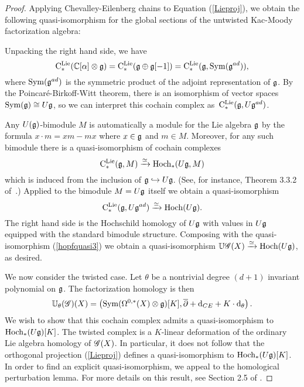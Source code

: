 \begin{proof}


Applying Chevalley-Eilenberg chains to Equation (\ref{Lieproj}), we obtain the following quasi-isomorphism for the global sections of the untwisted Kac-Moody factorization algebra:
\beqn\label{hopfquasi3}
\eeqn
Unpacking the right hand side, we have
\[
{\rm C}^{\rm Lie}_*(\mathbb C[\alpha] \otimes \mathfrak g) = {\rm C}^{\rm Lie}_*(\mathfrak g \oplus \mathfrak g[-1]) = {\rm C}^{\rm Lie}_*(\mathfrak g, {\rm Sym} (\mathfrak g^{ad})),
\] 
where ${\rm Sym}(\mathfrak g^{ad})$ is the symmetric product of the adjoint representation of $\mathfrak g$. 
By the Poincar\'{e}-Birkoff-Witt theorem, there is an isomorphism of vector spaces ${\rm Sym}(\mathfrak g) \cong U \mathfrak g$, so we can interpret this cochain complex as~${\rm C}^{\rm Lie}_*(\mathfrak g, U \mathfrak g^{ad})$.

Any $U(\mathfrak g)$-bimodule $M$ is automatically a module for the Lie algebra $\mathfrak g$ by the formula $x \cdot m = xm - mx$ where $x \in \mathfrak g$ and $m \in M$.
Moreover, for any such bimodule there is a quasi-isomorphism of cochain complexes 
\[
{\rm C}^{\rm Lie}_*(\mathfrak g, M) \xrightarrow{\simeq} {\rm Hoch}_*(U\mathfrak g, M) 
\]
which is induced from the inclusion of $\mathfrak g \hookrightarrow U \mathfrak g$. 
(See, for instance, Theorem 3.3.2 of~\cite{LodayCyclic}.)
Applied to the bimodule $M = U\mathfrak g$ itself we obtain a quasi-isomorphism 
\[
{\rm C}^{\rm Lie}_*(\mathfrak g , U\mathfrak g^{ad}) \xrightarrow{\simeq} {\rm Hoch}(U\mathfrak g).
\]
The right hand side is the Hochschild homology of $U\mathfrak g$ with values in $U\mathfrak g$ equipped with the standard bimodule structure. 
Composing with the quasi-isomorphism (\ref{hopfquasi3}) we obtain a quasi-isomorphism $\mathbb U\mathscr G(X) \xrightarrow{\simeq} {\rm Hoch}(U\mathfrak g)$, as desired.

We now consider the twisted case. 
Let $\theta$ be a nontrivial degree $(d+1)$ invariant polynomial on $\mathfrak g$. 
The factorization homology is then 
\[
\mathbb U_\theta (\mathscr G)(X) = \left({\rm Sym}(\Omega^{0,*}(X) \otimes \mathfrak g)[K] , \overline{\partial} + {\rm d}_{CE} + K \cdot {\rm d}_\theta\right) .
\]
We wish to show that this cochain complex admits a quasi-isomorphism to ${\rm Hoch}_*(U \mathfrak g)[K]$.
The twisted complex is a $K$-linear deformation of the ordinary Lie algebra homology of $\mathscr G(X)$. 
In particular, it does not follow that the orthogonal projection (\ref{Lieproj}) defines a quasi-isomorphism to ${\rm Hoch}_*(U \mathfrak g)[K]$.
In order to find an explicit quasi-isomorphism, we appeal to the homological perturbation lemma.
For more details on this result, see Section 2.5 of \cite{OwenThesis}. 


\end{proof}
